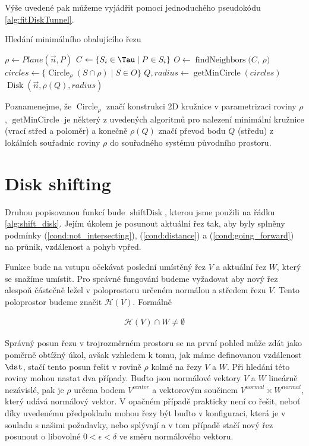 Výše uvedené pak můžeme vyjádřit pomocí jednoduchého pseudokódu \ref{alg:fitDiskTunnel}.

\begin{algorithm}
\caption{Hledání minimálního obalujícího řezu}
\label{alg:fitDiskTunnel}
\begin{algorithmic}[1]

    \State $ \rho \gets Plane(\vec{n}, P) $
    \State $ C \gets \{S_i \in \Tau \mid P \in S_i \} $
    \State $ O \gets \operatorname{findNeighbors}(C$, $\rho)$
    \State $ circles \gets \{ \operatorname{Circle}_{\rho}(S \cap \rho) \mid S \in O \} $
    \State $ Q, radius \gets \operatorname{getMinCircle}(circles) $
    \State \Return $ \operatorname{Disk}(\vec{n}, \rho(Q), radius) $
\EndFunction

\end{algorithmic}
\end{algorithm}
Poznamenejme, že $ \operatorname{Circle}_{\rho} $ značí konstrukci 2D kružnice
v parametrizaci roviny $ \rho $, $ \operatorname{getMinCircle} $ je některý z
uvedených algoritmů pro nalezení minimální kružnice (vrací střed a poloměr)
a konečně $ \rho(Q) $ značí převod bodu $ Q $ (středu) z lokálních souřadnic
roviny $ \rho $ do souřadného systému původního prostoru.



\section{Disk shifting} \label{subsec:disk_shift}
Druhou popisovanou funkcí bude $ \operatorname{shiftDisk} $, kterou jsme použili
na řádku \ref{alg:shift_disk}. Jejím úkolem je posunout aktuální řez tak, aby
byly splněny podmínky (\ref{cond:not_intersecting}), (\ref{cond:distance})
a (\ref{cond:going_forward}) na průnik, vzdálenost a pohyb vpřed.

Funkce bude na vstupu očekávat poslední umístěný řez $ V $ a aktuální řez $ W $,
který se snažíme umístit. Pro správné fungování budeme vyžadovat aby nový řez
alespoň částečně ležel v poloprostoru určeném normálou a středem řezu $ V $.
Tento poloprostor budeme značit $ \mathcal{H}(V) $. Formálně

\begin{align} \label{cond:halfspace}
    \mathcal{H}(V) \cap W \neq \emptyset
\end{align}

Správný posun řezu v trojrozměrném prostoru se na první pohled může zdát jako
poměrně obtížný úkol, avšak vzhledem k tomu, jak máme definovanou vzdálenost $ \dst $,
stačí tento posun řešit v rovině $ \rho $ kolmé na řezy $ V $ a $ W $. Při hledání této
roviny mohou nastat dva případy. Buďto jsou normálové vektory $ V $ a $ W $ lineárně
nezávislé, pak je $ \rho $ určena bodem $ V^{center} $ a vektorovým součinem
$ V^{normal} \times W^{normal} $, který udává normálový vektor. V opačném případě
prakticky není co řešit, neboť díky uvedenému předpokladu mohou řezy být buďto
v konfiguraci, která je v souladu s našimi požadavky, nebo splývají a v tom
případě stačí nový řez posunout o libovolné $ 0 < \epsilon < \delta $ ve směru
normálového vektoru.


